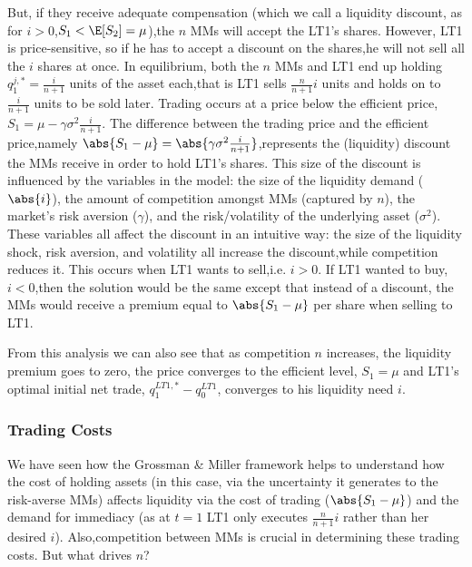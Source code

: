\documentclass[11pt]{article}
\begin{document}
But, if they receive adequate compensation (which we call a liquidity discount, as for
\(i>0\),\(S_1<\E[S_2]=\mu\)),the \(n\) MMs will accept the LT1's shares. However, LT1 is
price-sensitive, so if he has to accept a discount on the shares,he will not sell all the \(i\) shares
at once. In equilibrium, both the \(n\) MMs and LT1 end up holding \(q_1^{j,*}=\frac{i}{n+1}\) units
of the asset each,that is LT1 sells \(\frac{n}{n+1}i\) units and holds on to \(\frac{i}{n+1}\) units
to be sold later. Trading occurs at a price below the efficient price,
\(S_1=\mu-\gamma\sigma^2\frac{i}{n+1}\). The difference between the trading price and the efficient
price,namely \(\abs{S_1-\mu}=\abs{\gamma\sigma^2\frac{i}{n+1}}\),represents the (liquidity) discount
the MMs receive in order to hold LT1's shares. This size of the discount is influenced by the
variables in the model: the size of the liquidity demand (\(\abs{i}\)), the amount of competition
amongst MMs (captured by \(n\)), the market's risk aversion (\(\gamma\)), and the risk/volatility of
the underlying asset (\(\sigma^2\)). These variables all affect the discount in an intuitive way: the
size of the liquidity shock, risk aversion, and volatility all increase the discount,while competition
reduces it. This occurs when LT1 wants to sell,i.e. \(i>0\). If LT1 wanted to buy, \(i<0\),then the
solution would be the same except that instead of a discount, the MMs would receive a premium equal to
\(\abs{S_1-\mu}\) per share when selling to LT1.

From this analysis we can also see that as competition \(n\) increases, the liquidity premium goes to
zero, the price converges to the efficient level, \(S_1=\mu\) and LT1's optimal initial net trade,
\(q_1^{LT1,*}-q_0^{LT1}\), converges to his liquidity need \(i\).
\subsubsection{Trading Costs}
\label{sec:org6673408}
We have seen how the Grossman \& Miller framework helps to understand how the cost of holding assets
(in this case, via the uncertainty it generates to the risk-averse MMs) affects liquidity via the cost
of trading (\(\abs{S_1-\mu}\)) and the demand for immediacy (as at \(t=1\) LT1 only executes
\(\frac{n}{n+1}i\) rather than her desired \(i\)). Also,competition between MMs is crucial in
determining these trading costs. But what drives \(n\)?
\end{document}
